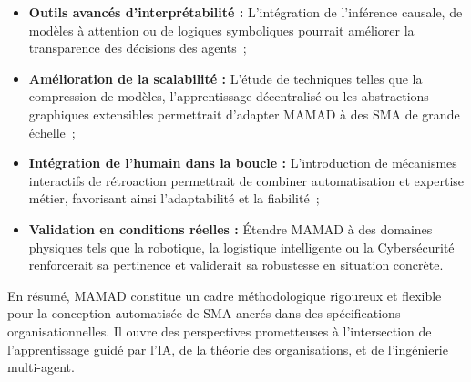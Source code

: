 \begin{itemize}
    \item \textbf{Outils avancés d'interprétabilité :} L'intégration de l'inférence causale, de modèles à attention ou de logiques symboliques pourrait améliorer la transparence des décisions des agents~;
    \item \textbf{Amélioration de la scalabilité :} L'étude de techniques telles que la compression de modèles, l'apprentissage décentralisé ou les abstractions graphiques extensibles permettrait d'adapter MAMAD à des SMA de grande échelle~;
    \item \textbf{Intégration de l'humain dans la boucle :} L'introduction de mécanismes interactifs de rétroaction permettrait de combiner automatisation et expertise métier, favorisant ainsi l'adaptabilité et la fiabilité~;
    \item \textbf{Validation en conditions réelles :} Étendre MAMAD à des domaines physiques tels que la robotique, la logistique intelligente ou la Cybersécurité renforcerait sa pertinence et validerait sa robustesse en situation concrète.
\end{itemize}

\noindent En résumé, MAMAD constitue un cadre méthodologique rigoureux et flexible pour la conception automatisée de SMA ancrés dans des spécifications organisationnelles. Il ouvre des perspectives prometteuses à l'intersection de l'apprentissage guidé par l'IA, de la théorie des organisations, et de l'ingénierie multi-agent.


